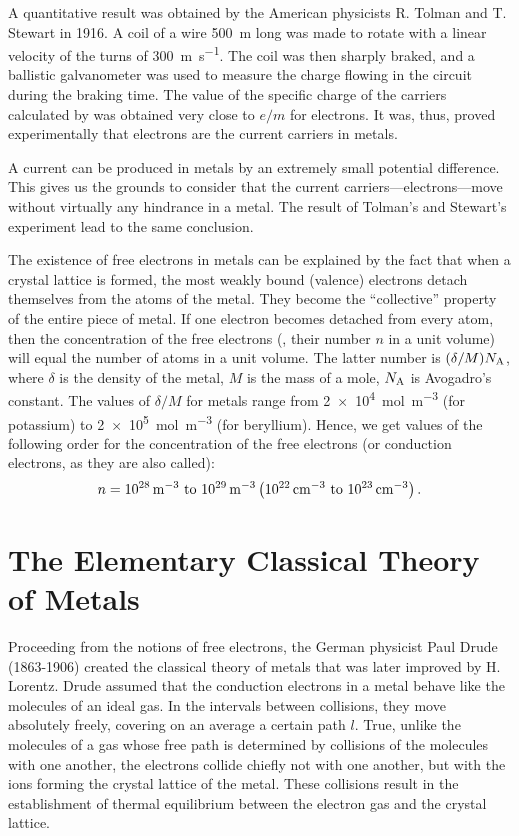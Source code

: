 A quantitative result was obtained by the American physicists R. Tolman and T. Stewart in 1916. A coil of a wire \SI{500}{\metre} long was made to rotate with a linear velocity of the turns of \SI{300}{\metre\per\second}.
The coil was then sharply braked, and a ballistic galvanometer was used to measure the charge flowing in the circuit during the braking time.
The value of the specific charge of the carriers calculated by  was obtained very close to $e/m$ for electrons.
It was, thus, proved experimentally that electrons are the current carriers in metals.

A current can be produced in metals by an extremely small potential difference.
This gives us the grounds to consider that the current carriers---electrons---move without virtually any hindrance in a metal.
The result of Tolman's and Stewart's experiment lead to the same conclusion.

The existence of free electrons in metals can be explained by the fact that when a crystal lattice is formed, the most weakly bound (valence) electrons detach themselves from the atoms of the metal.
They become the ``collective'' property of the entire piece of metal.
If one electron becomes detached from every atom, then the concentration of the free electrons (\ie, their number $n$ in a unit volume) will equal the number of atoms in a unit volume.
The latter number is $(\delta/M)N_{\text{A}}$, where $\delta$ is the density of the metal, $M$ is the mass of a mole, $N_{\text{A}}$ is Avogadro's constant.
The values of $\delta/M$ for metals range from \SI{2e4}{\mole\per\metre\cubed} (for potassium) to \SI{2e5}{\mole\per\metre\cubed} (for beryllium).
Hence, we get values of the following order for the concentration of the free electrons (or conduction electrons, as they are also called):
\begin{equation}\label{eq:11_2}
    n = \text{\SIrange{e28}{e29}{\per\metre\cubed}} \parenthesis{\text{\SIrange{e22}{e23}{\per\centi\metre\cubed}}}.
\end{equation}

\section{The Elementary Classical Theory of Metals}\label{sec:11_2}

Proceeding from the notions of free electrons, the German physicist Paul Drude (1863-1906) created the classical theory of metals that was later improved by H. Lorentz.
Drude assumed that the conduction electrons in a metal behave like the molecules of an ideal gas.
In the intervals between collisions, they move absolutely freely, covering on an average a certain path $l$.
True, unlike the molecules of a gas whose free path is determined by collisions of the molecules with one another, the electrons collide chiefly not with one another, but with the ions forming the crystal lattice of the metal.
These collisions result in the establishment of thermal equilibrium between the electron gas and the crystal lattice.

